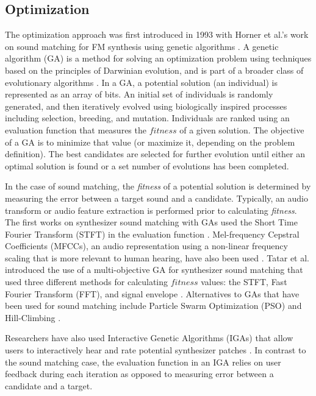 \subsection{Optimization}
The optimization approach was first introduced in 1993 with Horner et al.'s work on sound matching for FM synthesis using genetic algorithms \cite{horner1993machine}. A genetic algorithm (GA) is a method for solving an optimization problem using techniques based on the principles of Darwinian evolution, and is part of a broader class of evolutionary algorithms \cite{whitley1994genetic}. In a GA, a potential solution (an individual) is represented as an array of bits. An initial set of individuals is randomly generated, and then iteratively evolved using biologically inspired processes including selection, breeding, and mutation. Individuals are ranked using an evaluation function that measures the $fitness$ of a given solution. The objective of a GA is to minimize that value (or maximize it, depending on the problem definition). The best candidates are selected for further evolution until either an optimal solution is found or a set number of evolutions has been completed.

In the case of sound matching, the \textit{fitness} of a potential solution is determined by measuring the error between a target sound and a candidate. Typically, an audio transform or audio feature extraction is performed prior to calculating \textit{fitness}. The first works on synthesizer sound matching with GAs used the Short Time Fourier Transform (STFT) in the evaluation function \cite{horner1993machine, horner1995wavetable}. Mel-frequency Cepstral Coefficients (MFCCs), an audio representation using a non-linear frequency scaling that is more relevant to human hearing, have also been used \cite{yee2008synthbot, roth2011comparison, macret2014automatic, smith2017play}. Tatar et al. introduced the use of a multi-objective GA for synthesizer sound matching that used three different methods for calculating $fitness$ values: the STFT, Fast Fourier Transform (FFT), and signal envelope \cite{tatar2016automatic}. Alternatives to GAs that have been used for sound matching include Particle Swarm Optimization (PSO) \cite{heise2009automatic} and Hill-Climbing \cite{roth2011comparison, luke2019stochastic}.

Researchers have also used Interactive Genetic Algorithms (IGAs) that allow users to interactively hear and rate potential synthesizer patches \cite{johnson1999exploring, dahlstedt2001creating, yee2016use}. In contrast to the sound matching case, the evaluation function in an IGA relies on user feedback during each iteration as opposed to measuring error between a candidate and a target. 

